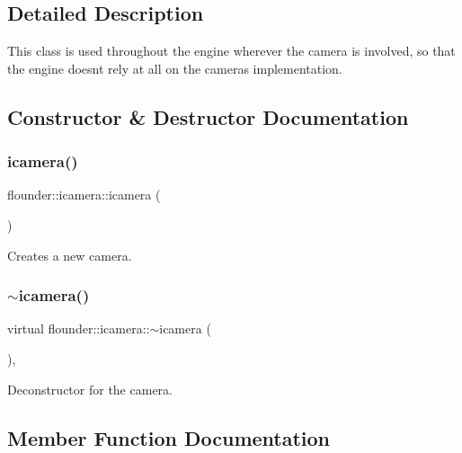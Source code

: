\subsection{Detailed Description}
This class is used throughout the engine wherever the camera is involved, so that the engine doesn\textquotesingle{}t rely at all on the camera\textquotesingle{}s implementation. 



\subsection{Constructor \& Destructor Documentation}
\mbox{\label{classflounder_1_1icamera_aec1dc813f1b6a4b4ea2c56d61fa28525}} 
\subsubsection{\texorpdfstring{icamera()}{icamera()}}
{\footnotesize\ttfamily flounder\+::icamera\+::icamera (\begin{DoxyParamCaption}{ }\end{DoxyParamCaption})\hspace{0.3cm}{\ttfamily [inline]}}



Creates a new camera. 

\mbox{\label{classflounder_1_1icamera_a5aa4bb60028823af733a8de1532b7f6f}} 
\subsubsection{\texorpdfstring{$\sim$icamera()}{~icamera()}}
{\footnotesize\ttfamily virtual flounder\+::icamera\+::$\sim$icamera (\begin{DoxyParamCaption}{ }\end{DoxyParamCaption})\hspace{0.3cm}{\ttfamily [inline]}, {\ttfamily [virtual]}}



Deconstructor for the camera. 



\subsection{Member Function Documentation}
\mbox{\label{classflounder_1_1icamera_a38f71d53573a018836d899973996a3c0}} 

